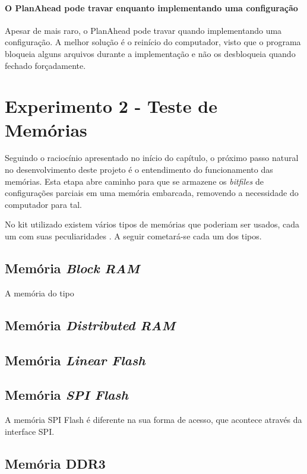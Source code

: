 \documentclass[11pt,a4paper,oneside]{book}
\begin{document}
\paragraph{O PlanAhead pode travar enquanto implementando uma configuração}
Apesar de mais raro, o PlanAhead pode travar quando implementando uma configuração.
A melhor solução é o reinício do computador, visto que o programa bloqueia alguns arquivos durante a implementação e não os desbloqueia quando fechado forçadamente.

\section{Experimento 2 - Teste de Memórias}
Seguindo o raciocínio apresentado no início do capítulo, o próximo passo natural no desenvolvimento deste projeto é o entendimento do funcionamento das memórias.
Esta etapa abre caminho para que se armazene os \textit{bitfiles} de configurações parciais em uma memória embarcada, removendo a necessidade do computador para tal.

No kit utilizado existem vários tipos de memórias que poderiam ser usados, cada um com suas peculiaridades \cite{ug810}.
A seguir cometará-se cada um dos tipos.

\subsection{Memória \textit{Block RAM}}
A memória do tipo 

\subsection{Memória\textit{ Distributed RAM}}

\subsection{Memória \textit{Linear Flash}}

\subsection{Memória \textit{SPI Flash}}
A memória SPI Flash é diferente na sua forma de acesso, que acontece através da interface SPI.


\subsection{Memória DDR3}
\end{document}
